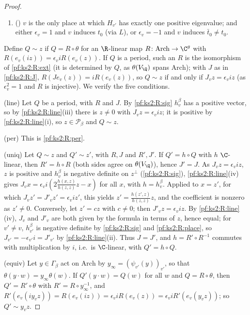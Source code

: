 \begin{proof}
\begin{enumerate}[label=(R\arabic*)]
  there are a period $Q$ and an $\R$-linear $R$ with $Q=R\circ\theta$ and
  $R(e_v(iz))=\epsilon_viR(e_v(z))$.
\item\label{pf:ks2:R:place} () $v$ is the only place at which
  $H_{v'}$ has exactly one positive eigenvalue; and either $\epsilon_v=1$ and $v$ induces $t_0$ (via
  $L$), or $\epsilon_v=-1$ and $v$ induces $\bar t_0\ne t_0$.
\end{enumerate}
Define $Q\sim z$ if $Q=R\circ\theta$ for an $\R$-linear map $R\colon\mathrm{Arch}\to\C^g$ with
$R(e_v(iz))=\epsilon_viR(e_v(z))$. If $Q$ is a period, such an $R$ is the isomorphism of
\ref{pf:ks2:R:ext} (it is determined by $Q$, as $\theta(V_\Q)$ spans $\mathrm{Arch}$); with $J$ as in
\ref{pf:ks2:R:J}, $R(Je_v(z))=iR(e_v(z))$, so $Q\sim z$ if and only if $J_vz=\epsilon_viz$ (as
$\epsilon_v^2=1$ and $R$ is injective). We verify the five conditions.

(line) Let $Q$ be a period, with $R$ and $J$. By \ref{pf:ks2:R:sig} $h^\beta_v$ has a positive vector,
so by \ref{pf:ks2:R:line}(iii) there is $z\ne0$ with $J_vz=\epsilon_viz$; it is positive by
\ref{pf:ks2:R:line}(i), so $z\in\mathcal P_\beta$ and $Q\sim z$.

(per) This is \ref{pf:ks2:R:per}.

(uniq) Let $Q\sim z$ and $Q'\sim z'$, with $R,J$ and $R',J'$. If $Q'=h\circ Q$ with $h$ $\C$-linear,
then $R'=h\circ R$ (both sides agree on $\theta(V_\Q)$), hence $J'=J$. As $J_vz=\epsilon_viz$, $z$ is
positive and $h^\beta_v$ is negative definite on $z^\perp$ (\ref{pf:ks2:R:sig}),
\ref{pf:ks2:R:line}(iv) gives $J_vx=\epsilon_vi(2\frac{h(x,z)}{h(z,z)}z-x)$ for all $x$, with
$h=h^\beta_v$. Applied to $x=z'$, for which $J_vz'=J'_vz'=\epsilon_viz'$, this yields
$z'=\frac{h(z',z)}{h(z,z)}z$, and the coefficient is nonzero as $z'\ne0$. Conversely, let $z'=cz$ with
$c\ne0$; then $J'_vz=\epsilon_viz$. By \ref{pf:ks2:R:line}(iv), $J_v$ and $J'_v$ are both given by the
formula in terms of $z$, hence equal; for $v'\ne v$, $h^\beta_{v'}$ is negative definite by
\ref{pf:ks2:R:sig} and \ref{pf:ks2:R:place}, so $J_{v'}=-\epsilon_{v'}i=J'_{v'}$ by
\ref{pf:ks2:R:line}(ii). Thus $J=J'$, and $h=R'\circ R^{-1}$ commutes with multiplication by $i$, i.e.\
is $\C$-linear, with $Q'=h\circ Q$.

(equiv) Let $y\in\Gamma_\beta$ act on $\mathrm{Arch}$ by $y_\infty=(\psi_{v'}(y))_{v'}$, so that
$\theta(y\cdot w)=y_\infty\theta(w)$. If $Q'(y\cdot w)=Q(w)$ for all $w$ and $Q=R\circ\theta$, then
$Q'=R'\circ\theta$ with $R'=R\circ y_\infty^{-1}$, and
$R'(e_v(iy_vz))=R(e_v(iz))=\epsilon_viR(e_v(z))=\epsilon_viR'(e_v(y_vz))$; so $Q'\sim y_vz$.


\end{proof}

